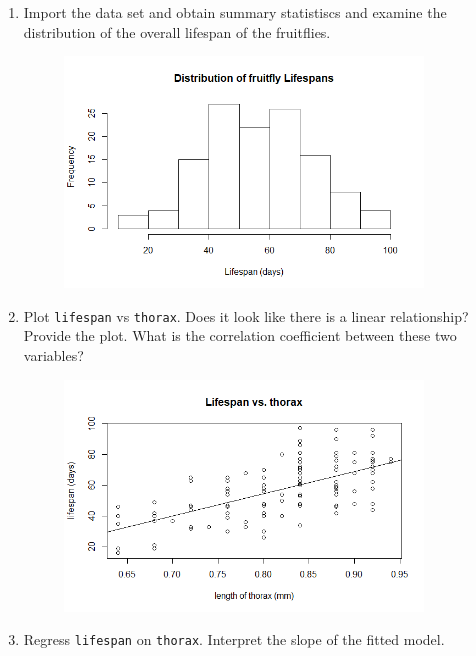 \documentclass[12pt,letterpaper]{article}
\begin{document}
\begin{enumerate}
	
	\item
	Import the data set and obtain summary statistiscs and examine the distribution of the overall lifespan of the fruitflies.  
	
	\begin{figure}[h!]
		\label{Q2}
		\includegraphics[width=0.9\textwidth]{Q2.png}
	\end{figure}

\newpage
	\item
	Plot \texttt{lifespan} vs \texttt{thorax}. Does it look like there is a linear relationship? Provide the plot. What is the correlation coefficient between these two variables?
	\begin{figure}[h!]
		\label{figure1}
		\includegraphics[width=0.9\textwidth]{Q2-cor.png}
	\end{figure}
	
	\vspace{.5cm}	
	\item
	Regress \texttt{lifespan} on \texttt{thorax}.  Interpret the slope of the fitted model.
	

\end{enumerate}
\end{document}
